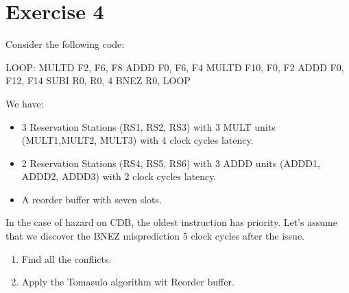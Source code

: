 \section{Exercise 4}

Consider the following code: 
\begin{verbnobox}[\verbarg]
LOOP:   MULTD F2, F6, F8
        ADDD F0, F6, F4
        MULTD F10, F0, F2
        ADDD F0, F12, F14
        SUBI R0, R0, 4
        BNEZ R0, LOOP
\end{verbnobox}
We have: 
\begin{itemize}
    \item 3 Reservation Stations (RS1, RS2, RS3) with 3 MULT units (MULT1,MULT2, MULT3) with 4 clock cycles latency.
    \item 2 Reservation Stations (RS4, RS5, RS6) with 3 ADDD units (ADDD1, ADDD2, ADDD3) with 2 clock cycles latency.
    \item A reorder buffer with seven slots. 
\end{itemize}
In the case of hazard on CDB, the oldest instruction has priority.
Let's assume that we discover the BNEZ misprediction 5 clock cycles after the issue.
\begin{enumerate}
    \item Find all the conflicts. 
    \item Apply the Tomasulo algorithm wit Reorder buffer. 
\end{enumerate}

